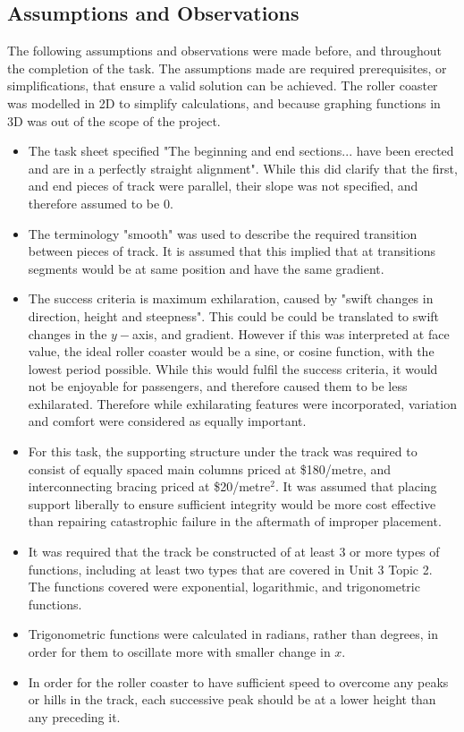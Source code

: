 \documentclass[10pt, letterpaper]{article}
\begin{document}
\subsection{Assumptions and Observations}
The following assumptions and observations were made before, and throughout the completion of the task. The assumptions made are required prerequisites, or simplifications, that ensure a valid solution can be achieved.
The roller coaster was modelled in 2D to simplify calculations, and because graphing functions in 3D was out of the scope of the project. 
\begin{itemize}
	\item The task sheet specified "The beginning and end sections... have been erected and are in a perfectly straight alignment". While this did clarify that the first, and end pieces of track were parallel, their slope was not specified, and therefore assumed to be 0.
	
	\item The terminology "smooth" was used to describe the required transition between pieces of track. It is assumed that this implied that at transitions segments would be at same position and have the same gradient.
	
	\item The success criteria is maximum exhilaration, caused by "swift changes in direction, height and steepness". This could be could be translated to swift changes in the $y-$axis, and gradient. However if this was interpreted at face value, the ideal roller coaster would be a sine, or cosine function, with the lowest period possible. While this would fulfil the success criteria, it would not be enjoyable for passengers, and therefore caused them to be less exhilarated. Therefore while exhilarating features were incorporated, variation and comfort were considered as equally important. 
	
	\item For this task, the supporting structure under the track was required to consist of equally spaced main columns priced at \$180/metre, and interconnecting bracing priced at \$20/metre$^2$. It was assumed that placing support liberally to ensure sufficient integrity would be more cost effective than repairing catastrophic failure in the aftermath of improper placement.
	
	
	\item It was required that the track be constructed of at least 3 or more types of functions, including at least two types that are covered in Unit 3 Topic 2. The functions covered were exponential, logarithmic, and trigonometric functions.
	
	\item Trigonometric functions were calculated in radians, rather than degrees, in order for them to oscillate more with smaller change in $x$.
	
	\item In order for the roller coaster to have sufficient speed to overcome any peaks or hills in the track, each successive peak should be at a lower height than any preceding it.
	
\end{itemize}
\end{document}

